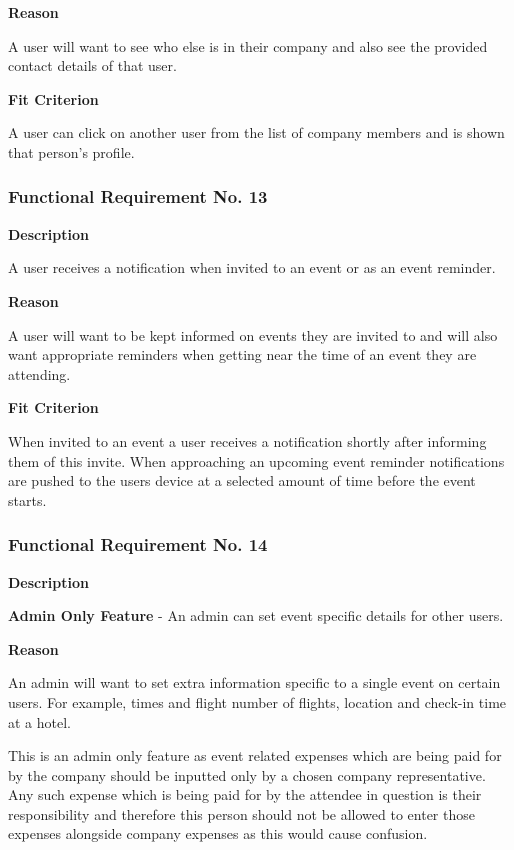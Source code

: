\textbf{Reason}

A user will want to see who else is in their company and also see the provided contact details of that user.


\textbf{Fit Criterion}

A user can click on another user from the list of company members and is shown that person's profile.

\subsubsection{Functional Requirement No. 13}

\textbf{Description}

A user receives a notification when invited to an event or as an event reminder.

\textbf{Reason}

A user will want to be kept informed on events they are invited to and will also want appropriate reminders when getting near the time of an event they are attending.

\textbf{Fit Criterion}

When invited to an event a user receives a notification shortly after informing them of this invite. When approaching an upcoming event reminder notifications are pushed to the users device at a selected amount of time before the event starts.

\subsubsection{Functional Requirement No. 14}

\textbf{Description}

\textbf{Admin Only Feature} - An admin can set event specific details for other users.

\textbf{Reason}

An admin will want to set extra information specific to a single event on certain users. For example, times and flight number of flights, location and check-in time at a hotel.

This is an admin only feature as event related expenses which are being paid for by the company should be inputted only by a chosen company representative. Any such expense which is being paid for by the attendee in question is their responsibility and therefore this person should not be allowed to enter those expenses alongside company expenses as this would cause confusion.

